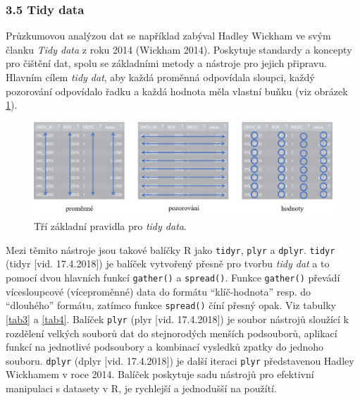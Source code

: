 \documentclass[12pt,]{article}
\begin{document}
\subsubsection{3.5 Tidy data}\label{tidy-data}

\qquad Průzkumovou analýzou dat se například zabýval Hadley Wickham ve
svým članku \emph{Tidy data} z roku 2014 (Wickham 2014). Poskytuje
standardy a koncepty pro čištění dat, spolu se základními metody a
nástroje pro jejich připravu. Hlavním cílem \emph{tidy dat}, aby každá
proměnná odpovídala sloupci, každý pozorování odpovídalo řadku a každá
hodnota měla vlastní buňku (viz obrázek \ref{fig:ch3.5}).

\begin{figure}[H]
      \includegraphics[width=\textwidth]{fig/tidy}
      \caption{Tří základní pravidla pro \textit{tidy data}.}
      \label{fig:ch3.5}
\end{figure}

Mezi těmito nástroje jsou takové balíčky R jako \texttt{tidyr},
\texttt{plyr} a \texttt{dplyr}. \texttt{tidyr} (tidyr {[}vid.
17.4.2018{]}) je balíček vytvořený přesně pro tvorbu \emph{tidy dat} a
to pomocí dvou hlavních funkcí \texttt{gather()} a \texttt{spread()}.
Funkce \texttt{gather()} převádí vícesloupcové (víceproměnné) data do
formátu \enquote{klíč-hodnota} resp. do \enquote{dlouhého} formátu,
zatímco funkce \texttt{spread()} číní přesný opak. Viz tabulky
\ref{tab3} a \ref{tab4}. Balíček \texttt{plyr} (plyr {[}vid.
17.4.2018{]}) je soubor nástrojů sloužící k rozdělení velkých souborů
dat do stejnorodých menších podsouborů, aplikací funkcí na jednotlivé
podsoubory a kombinací vysledků zpatky do jednoho souboru.
\texttt{dplyr} (dplyr {[}vid. 17.4.2018{]}) je další iteraci
\texttt{plyr} představenou Hadley Wickhamem v roce 2014. Balíček
poskytuje sadu nástrojů pro efektivní manipulaci s datasety v R, je
rychlejší a jednodušší na použítí.
\end{document}
